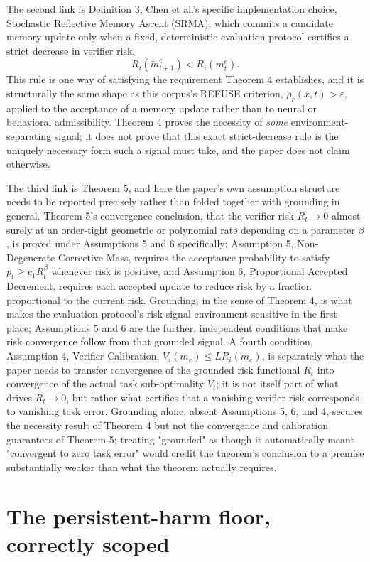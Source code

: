 \documentclass[11pt]{article}
\begin{document}
The second link is Definition 3, Chen et al.'s specific implementation choice, Stochastic Reflective Memory Ascent (SRMA), which commits a candidate memory update only when a fixed, deterministic evaluation protocol certifies a strict decrease in verifier risk,
$$R_i(\tilde{m}_{t+1}^e) < R_i(m_t^e).$$
This rule is one way of satisfying the requirement Theorem 4 establishes, and it is structurally the same shape as this corpus's REFUSE criterion, $\rho_r(x,t) > \varepsilon$, applied to the acceptance of a memory update rather than to neural or behavioral admissibility. Theorem 4 proves the necessity of \emph{some} environment-separating signal; it does not prove that this exact strict-decrease rule is the uniquely necessary form such a signal must take, and the paper does not claim otherwise.

The third link is Theorem 5, and here the paper's own assumption structure needs to be reported precisely rather than folded together with grounding in general. Theorem 5's convergence conclusion, that the verifier risk $R_t \to 0$ almost surely at an order-tight geometric or polynomial rate depending on a parameter $\beta$, is proved under Assumptions 5 and 6 specifically: Assumption 5, Non-Degenerate Corrective Mass, requires the acceptance probability to satisfy $p_t \ge c_1 R_t^\beta$ whenever risk is positive, and Assumption 6, Proportional Accepted Decrement, requires each accepted update to reduce risk by a fraction proportional to the current risk. Grounding, in the sense of Theorem 4, is what makes the evaluation protocol's risk signal environment-sensitive in the first place; Assumptions 5 and 6 are the further, independent conditions that make risk convergence follow from that grounded signal. A fourth condition, Assumption 4, Verifier Calibration, $V_i(m_e) \le L R_i(m_e)$, is separately what the paper needs to transfer convergence of the grounded risk functional $R_t$ into convergence of the actual task sub-optimality $V_t$; it is not itself part of what drives $R_t \to 0$, but rather what certifies that a vanishing verifier risk corresponds to vanishing task error. Grounding alone, absent Assumptions 5, 6, and 4, secures the necessity result of Theorem 4 but not the convergence and calibration guarantees of Theorem 5; treating "grounded" as though it automatically meant "convergent to zero task error" would credit the theorem's conclusion to a premise substantially weaker than what the theorem actually requires.

\section{The persistent-harm floor, correctly scoped}
\end{document}
